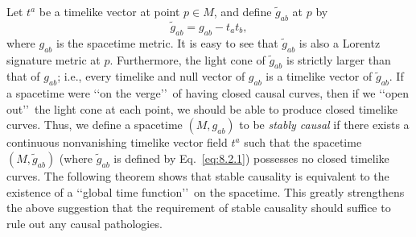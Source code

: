 Let \(t^a\) be a timelike vector at point \(p\in M\), and define \(\widetilde g_{ab}\)
at \(p\) by
\begin{equation}
  \widetilde g_{ab}=g_{ab}-t_at_b,
  \tag{8.2.1}\label{eq:8.2.1}
\end{equation}
where \(g_{ab}\) is the spacetime metric. It is easy to see that \(\widetilde g_{ab}\)
is also a Lorentz signature metric at \(p\). Furthermore, the light cone of
\(\widetilde g_{ab}\) is strictly larger than that of \(g_{ab}\); i.e., every timelike
and null vector of \(g_{ab}\) is a timelike vector of \(\widetilde g_{ab}\). If a
spacetime were \lq\lq on the verge\rq\rq\ of having closed causal curves, then if we
\lq\lq open out\rq\rq\ the light cone at each point, we should be able to produce closed
timelike curves. Thus, we define a spacetime \((M,g_{ab})\) to be \emph{stably
causal} if there exists a continuous nonvanishing timelike vector field \(t^a\) such
that the spacetime \((M,\widetilde g_{ab})\) (where \(\widetilde g_{ab}\) is defined
by Eq.~\eqref{eq:8.2.1}) possesses no closed timelike curves. The following theorem
shows that stable causality is equivalent to the existence of a \lq\lq global time
function\rq\rq\ on the spacetime. This greatly strengthens the above suggestion that
the requirement of stable causality should suffice to rule out any causal pathologies.

